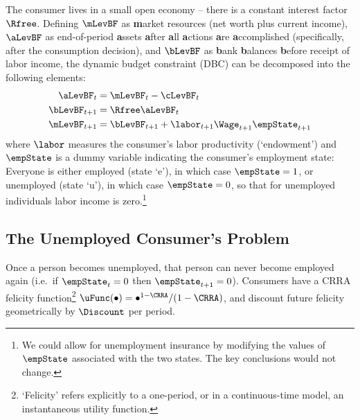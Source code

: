 \documentclass{\handout}
\begin{document}
The consumer lives in a small open economy -- there is a constant interest factor $\Rfree$.  Defining $\mLevBF$ as \textbf{m}arket resources (net worth plus current income), $\aLevBF$ as end-of-period \textbf{a}ssets \textbf{a}fter \textbf{a}ll \textbf{a}ctions \textbf{a}re \textbf{a}ccomplished (specifically, after the consumption decision), and $\bLevBF$ as \textbf{b}ank \textbf{b}alances \textbf{b}efore receipt of labor income, the dynamic budget constraint (DBC) can be decomposed into the following elements:
\begin{equation}\begin{gathered}\begin{aligned}
    \aLevBF_{t} & =  \mLevBF_{t}-\cLevBF_{t}
\\  \bLevBF_{t+1} & =  \Rfree \aLevBF_{t}
\\  \mLevBF_{t+1} & =  \bLevBF_{t+1}+\labor_{t+1}\Wage_{t+1}\empState_{t+1}  \label{eq:DBC}
\end{aligned}\end{gathered}\end{equation}
where $\labor$ measures the consumer's labor productivity (`endowment') and $\empState$ is a dummy variable indicating the consumer's employment state: Everyone is either employed (state `e'), in which case $\empState = 1$, or unemployed (state `u'), in which case $\empState=0$, so that for unemployed individuals labor income is zero.\footnote{We could allow for unemployment insurance by modifying the values of $\empState$ associated with the two states.  The key conclusions would not change.}

\pagebreak 
\subsection{The Unemployed Consumer's Problem} \label{subsec:Fred}

Once a person becomes unemployed, that person can never become
employed again (i.e.\ if $\empState_{t}=0$ then $\empState_{t+1}=0$).
Consumers have a CRRA felicity function\footnote{`Felicity' refers
  explicitly to a one-period, or in a continuous-time model, an
  instantaneous utility function.}
$\uFunc(\bullet)= \bullet^{1-\CRRA}/(1-\CRRA)$, and discount
future felicity geometrically by $\Discount$ per period.
\end{document}
